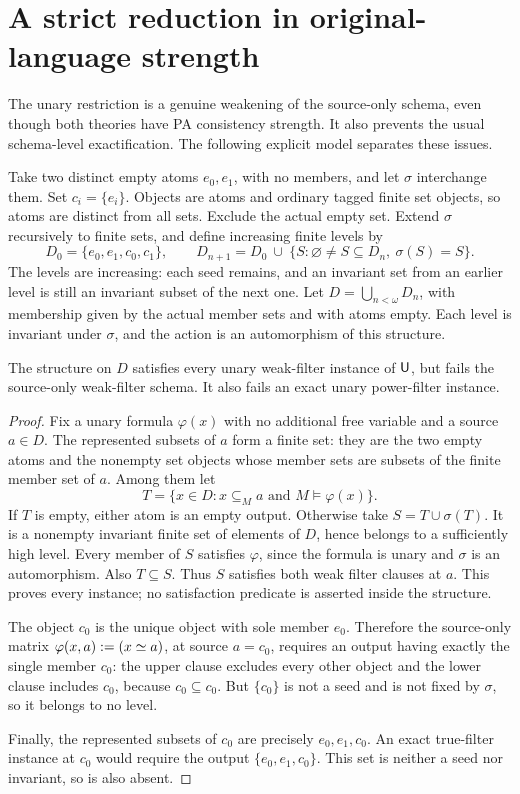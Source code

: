 \section{A strict reduction in original-language strength}\label{un:strict}

The unary restriction is a genuine weakening of the source-only schema,
even though both theories have PA consistency strength. It also prevents
the usual schema-level exactification. The following explicit model
separates these issues.

Take two distinct empty atoms $e_0,e_1$, with no members, and let
$\sigma$ interchange them. Set $c_i=\{e_i\}$. Objects are atoms and
ordinary tagged finite set objects, so atoms are distinct from all sets.
Exclude the actual empty set. Extend $\sigma$ recursively to finite sets,
and define increasing finite levels by
\[
 D_0=\{e_0,e_1,c_0,c_1\},\qquad
 D_{n+1}=D_0\ \cup\
       \{S:\varnothing\ne S\subseteq D_n,\ \sigma(S)=S\}.
\]
The levels are increasing: each seed remains, and an invariant set from
an earlier level is still an invariant subset of the next one. Let
$D=\bigcup_{n<\omega}D_n$, with membership given by the actual member
sets and with atoms empty. Each level is invariant under $\sigma$,
and the action is an automorphism of this structure.

\begin{proposition}\label{un:orbit}
The structure on $D$ satisfies every unary weak-filter instance of
$\mathsf{U}$, but fails the source-only weak-filter schema. It also fails an
exact unary power-filter instance.
\end{proposition}
\begin{proof}
Fix a unary formula $\varphi(x)$ with no additional free variable and
a source $a\in D$. The represented subsets of $a$ form a finite set:
they are the two empty atoms and the nonempty set objects whose member
sets are subsets of the finite member set of $a$. Among them let
\[
 T=\{x\in D:x\subseteq_M a\text{ and }M\models\varphi(x)\}.
\]
If $T$ is empty, either atom is an empty output. Otherwise take
$S=T\cup\sigma(T)$. It is a nonempty invariant finite set of elements
of $D$, hence belongs to a sufficiently high level. Every member of
$S$ satisfies $\varphi$, since the formula is unary and $\sigma$ is
an automorphism. Also $T\subseteq S$. Thus $S$ satisfies both weak
filter clauses at $a$. This proves every instance; no satisfaction
predicate is asserted inside the structure.

The object $c_0$ is the unique object with sole member $e_0$. Therefore
the source-only matrix $\varphi(x,a):=(x\mathrel{\simeq} a)$, at source $a=c_0$,
requires an output having exactly the single member $c_0$: the upper
clause excludes every other object and the lower clause includes
$c_0$, because $c_0\subseteq c_0$. But $\{c_0\}$ is not a seed and
is not fixed by $\sigma$, so it belongs to no level.

Finally, the represented subsets of $c_0$ are precisely
$e_0,e_1,c_0$. An exact true-filter instance at $c_0$ would require
the output $\{e_0,e_1,c_0\}$. This set is neither a seed nor invariant,
so is also absent.
\end{proof}

